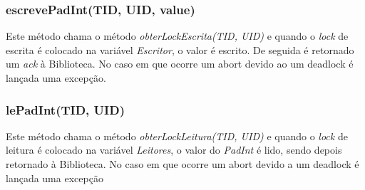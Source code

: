 \subsubsection{escrevePadInt(TID, UID, value)}

Este método chama o método \textit{obterLockEscrita(TID, UID)} e quando o \textit{lock} de escrita é colocado na variável \textit{Escritor}, o valor é escrito. De seguida é retornado um \textit{ack} à Biblioteca. No caso em que ocorre um abort devido ao um deadlock é lançada uma excepção.

\subsubsection{lePadInt(TID, UID)}

Este método chama o método \textit{obterLockLeitura(TID, UID)} e quando o \textit{lock} de leitura é colocado na variável \textit{Leitores}, o valor do \textit{PadInt} é lido, sendo depois retornado à Biblioteca. No caso em que ocorre um abort devido a um deadlock é lançada uma excepção